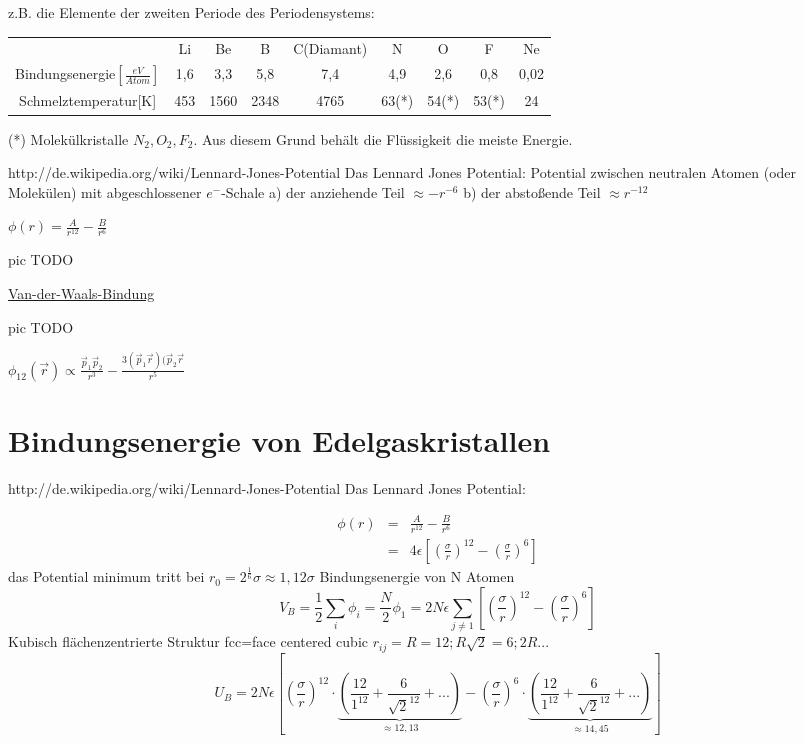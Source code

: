 z.B. die Elemente der zweiten Periode des Periodensystems:
\begin{tabular}{ccccccccc}
&Li&Be&B&C(Diamant)&N&O&F&Ne\\
Bindungsenergie\(\left[\frac{eV}{Atom}\right]\)&1,6&3,3&5,8&7,4&4,9&2,6&0,8&0,02\\
Schmelztemperatur[K]&453&1560&2348&4765&63(*)&54(*)&53(*)&24
\end{tabular}

(*) Molekülkristalle \(N_2,O_2,F_2\). Aus diesem Grund behält die Flüssigkeit die
meiste Energie.


http://de.wikipedia.org/wiki/Lennard-Jones-Potential
Das Lennard Jones Potential:
Potential zwischen neutralen Atomen (oder Molekülen) mit abgeschlossener
\(e^-\)-Schale
a) der anziehende Teil \(\approx -r^{-6}\)
b) der abstoßende Teil \(\approx r^{-12}\)

\(\boxed{\phi(r)=\frac A {r^{12}}-\frac B {r^{6}}}\)

pic TODO

\underline{Van-der-Waals-Bindung}

pic TODO

\(\phi_{12}(\vec r) \propto \frac {\vec p_1\vec p_2}{r^3}-\frac{3(\vec p_1 \vec
  r)(\vec p_2 \vec r}{r^5}\)

\section{Bindungsenergie von Edelgaskristallen}

http://de.wikipedia.org/wiki/Lennard-Jones-Potential
Das Lennard Jones Potential:

 
\begin{eqnarray}
\phi(r) &=& \frac A {r^{12}}-\frac B {r^6} \\
&=&4\epsilon \left[ \left(\frac\sigma r\right)^{12}-\left(\frac\sigma r\right)^6\right]
\end{eqnarray}
das Potential minimum tritt bei \(r_0=2^{\frac 1 6}\sigma\approx 1,12\sigma\)
Bindungsenergie von N Atomen
\[ V_B=\frac 1 2 \sum_i\phi_i=\frac N 2 \phi_1=2N\epsilon\sum_{j\neq1}\left[
  \left(\frac\sigma r\right)^{12}-\left(\frac\sigma r\right)^6\right] \]
Kubisch flächenzentrierte Struktur fcc=face centered cubic \(r_{ij}=R=12;R\sqrt
2=6;2R...\)
\[ U_B=2N\epsilon\left[
  \left(\frac\sigma r\right)^{12}\cdot\underbrace{
    \left(\frac{12}{1^12}+\frac{6}{\sqrt 2^{12}}+...\right)}_{\approx 12,13}
-\left(\frac\sigma r\right)^6 \cdot\underbrace{
  \left(\frac{12}{1^12}+\frac{6}{\sqrt 2^{12}}+...\right)}_{\approx 14,45}
\right]
\]

